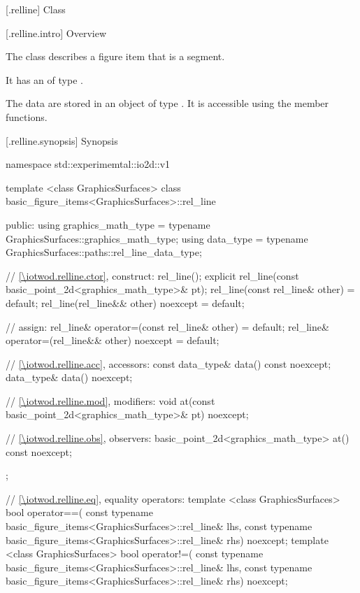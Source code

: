  [\iotwod.relline] {Class }

 [\iotwod.relline.intro] {Overview}

\pnum
{}%
The class  describes a figure item that is a segment.

\pnum
It has an  of type .

\pnum
The data are stored in an object of type . It is accessible using the  member functions.

 [\iotwod.relline.synopsis] {Synopsis}
\begin{codeblock}
namespace std::experimemtal::io2d::v1 {
  template <class GraphicsSurfaces>
  class basic_figure_items<GraphicsSurfaces>::rel_line {
  public:
    using graphics_math_type = typename GraphicsSurfaces::graphics_math_type;
    using data_type =
      typename GraphicsSurfaces::paths::rel_line_data_type;

    // \ref{\iotwod.relline.ctor}, construct:
    rel_line();
    explicit rel_line(const basic_point_2d<graphics_math_type>& pt);
    rel_line(const rel_line& other) = default;
    rel_line(rel_line&& other) noexcept = default;

    // assign:
    rel_line& operator=(const rel_line& other) = default;
    rel_line& operator=(rel_line&& other) noexcept = default;

    // \ref{\iotwod.relline.acc}, accessors:
    const data_type& data() const noexcept;
    data_type& data() noexcept;

    // \ref{\iotwod.relline.mod}, modifiers:
    void at(const basic_point_2d<graphics_math_type>& pt) noexcept;

    // \ref{\iotwod.relline.obs}, observers:
    basic_point_2d<graphics_math_type> at() const noexcept;
  };
  
  // \ref{\iotwod.relline.eq}, equality operators:
  template <class GraphicsSurfaces>
  bool operator==(
    const typename basic_figure_items<GraphicsSurfaces>::rel_line& lhs,
    const typename basic_figure_items<GraphicsSurfaces>::rel_line& rhs) 
    noexcept;  
  template <class GraphicsSurfaces>
  bool operator!=(
    const typename basic_figure_items<GraphicsSurfaces>::rel_line& lhs,
    const typename basic_figure_items<GraphicsSurfaces>::rel_line& rhs) 
    noexcept;  
}
\end{codeblock}

